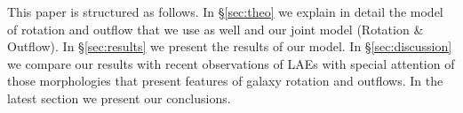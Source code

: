 \documentclass{latex/emulateapj}
\begin{document}
This paper is structured as follows. In \S \ref{sec:theo} we explain in detail the model of rotation and outflow that we use as well and our joint model (Rotation \& Outflow). In \S \ref{sec:results} we present the results of our model. In \S \ref{sec:discussion} we compare our results with recent observations of LAEs with special attention of
those morphologies that present features of galaxy rotation and outflows. In the latest section we present our conclusions.  






\end{document}
